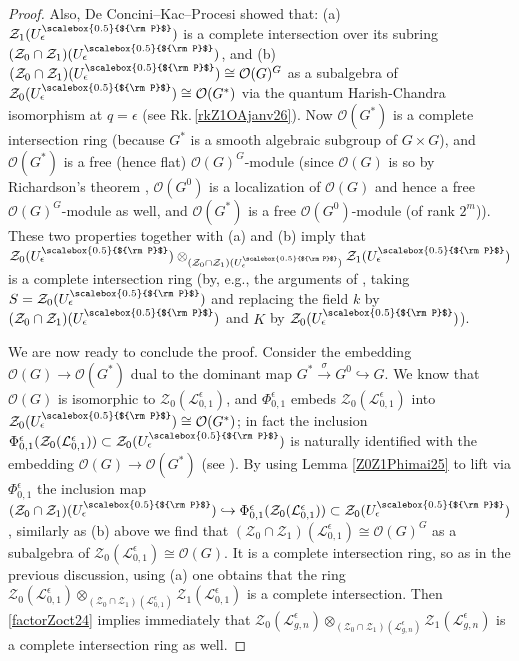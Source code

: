 \documentclass[11pt]{amsart}
\newcommand{\e}{\epsilon}
\newcommand{\Ll}{\mathcal{L}}
\newcommand{\Oo}{\mathcal{O}}
\newcommand{\Pup}{{\scalebox{0.5}{${\rm P}$}}}
\begin{document}
\begin{proof}
Also, De Concini--Kac--Procesi showed that: (a)  $\mathcal{Z}_1(U_\e^\Pup)$ is a complete intersection over its subring $(\mathcal{Z}_0 \cap \mathcal{Z}_1)(U_\e^\Pup)$, and (b) $(\mathcal{Z}_0 \cap \mathcal{Z}_1)(U_\e^\Pup) \cong \Oo(G)^{G}$ as a subalgebra of $\mathcal{Z}_0(U_\e^\Pup)\cong \Oo(G^*)$ via the quantum Harish-Chandra isomorphism at $q=\e$ (see Rk.\,\ref{rkZ1OAjanv26}). Now $\Oo(G^*)$ is a complete intersection ring (because $G^*$ is a smooth algebraic subgroup of $G\times G$), and $\Oo(G^*)$ is a free (hence flat) $\Oo(G)^G$-module (since $\Oo(G)$ is so by Richardson's theorem \cite{Richardson}, $\Oo(G^0)$ is a localization of $\Oo(G)$ and hence a free $\Oo(G)^{G}$-module as well, and $\Oo(G^*)$ is a free $\Oo(G^0)$-module (of rank $2^m$)). These two properties together with (a) and (b) imply that $\mathcal{Z}_0(U_\e^\Pup)\otimes_{(\mathcal{Z}_0 \cap \mathcal{Z}_1)(U_\e^\Pup)}\mathcal{Z}_1(U_{\e}^\Pup)$ is a complete intersection ring (by, e.g., the arguments of \cite[Lem.\,10.135.1]{StackP}, taking $S = \mathcal{Z}_0(U_\e^\Pup)$ and replacing the field $k$ by $(\mathcal{Z}_0 \cap \mathcal{Z}_1)(U_\e^\Pup)$ and $K$ by $\mathcal{Z}_0(U_{\e}^\Pup)$).

We are now ready to conclude the proof. Consider the embedding $\Oo(G)\to \Oo(G^*)$ dual to the dominant map $G^* \stackrel{\sigma}{\to} G^0 \hookrightarrow G$. We know that $\Oo(G)$ is isomorphic to $\mathcal{Z}_0(\mathcal{L}_{0,1}^\e)$, and $\Phi_{0,1}^\e$ embeds $\mathcal{Z}_0(\mathcal{L}_{0,1}^\e)$ into $\mathcal{Z}_0(U_\e^\Pup)\cong \Oo(G^*)$; in fact the inclusion $\Phi_{0,1}^\e(\mathcal{Z}_0(\mathcal{L}_{0,1}^\e))\subset \mathcal{Z}_0(U_\e^\Pup)$ is naturally identified with the embedding $\Oo(G)\to \Oo(G^*)$ (see \cite[Lem.\,4.2 and Rk.\,4.3]{BR2}). By using Lemma \ref{Z0Z1Phimai25} to lift via $\Phi_{0,1}^\e$ the inclusion map $(\mathcal{Z}_0 \cap \mathcal{Z}_1)(U_\e^\Pup) \hookrightarrow \Phi_{0,1}^\e(\mathcal{Z}_0(\mathcal{L}_{0,1}^\e)) \subset \mathcal{Z}_0(U_\e^\Pup)$, similarly as (b) above we find that $(\mathcal{Z}_0 \cap \mathcal{Z}_1)(\Ll_{0,1}^\e) \cong \Oo(G)^G$ as a subalgebra of $\mathcal{Z}_0(\Ll_{0,1}^\e)\cong \Oo(G)$. It is a complete intersection ring, so as in the previous discussion, using (a) one obtains that the ring $\mathcal{Z}_0(\mathcal{L}_{0,1}^\e)\otimes_{(\mathcal{Z}_0 \cap \mathcal{Z}_1)(\Ll_{0,1}^\e)} \mathcal{Z}_1(\mathcal{L}_{0,1}^{\e})$ is a complete intersection. Then \eqref{factorZoct24} implies immediately that $\mathcal{Z}_0(\mathcal{L}_{g,n}^{\e}) \otimes_{(\mathcal{Z}_0 \cap \mathcal{Z}_1)(\mathcal{L}_{g,n}^{\e})} \mathcal{Z}_1(\mathcal{L}_{g,n}^{\e})$ is a complete intersection ring as well. 


\end{proof}
\end{document}
